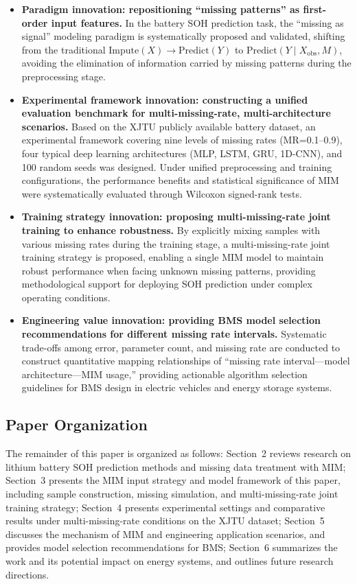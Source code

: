 \documentclass[10pt,a4paper]{article}
\begin{document}
\begin{itemize}
  \item \textbf{Paradigm innovation: repositioning ``missing patterns'' as first-order input features.} In the battery SOH prediction task, the ``missing as signal'' modeling paradigm is systematically proposed and validated, shifting from the traditional $\text{Impute}(X)\rightarrow\text{Predict}(Y)$ to $\text{Predict}(Y \mid X_{\mathrm{obs}}, M)$, avoiding the elimination of information carried by missing patterns during the preprocessing stage.

  \item \textbf{Experimental framework innovation: constructing a unified evaluation benchmark for multi-missing-rate, multi-architecture scenarios.} Based on the XJTU publicly available battery dataset, an experimental framework covering nine levels of missing rates (MR=0.1--0.9), four typical deep learning architectures (MLP, LSTM, GRU, 1D-CNN), and 100 random seeds was designed. Under unified preprocessing and training configurations, the performance benefits and statistical significance of MIM were systematically evaluated through Wilcoxon signed-rank tests.

  \item \textbf{Training strategy innovation: proposing multi-missing-rate joint training to enhance robustness.} By explicitly mixing samples with various missing rates during the training stage, a multi-missing-rate joint training strategy is proposed, enabling a single MIM model to maintain robust performance when facing unknown missing patterns, providing methodological support for deploying SOH prediction under complex operating conditions.

  \item \textbf{Engineering value innovation: providing BMS model selection recommendations for different missing rate intervals.} Systematic trade-offs among error, parameter count, and missing rate are conducted to construct quantitative mapping relationships of ``missing rate interval---model architecture---MIM usage,'' providing actionable algorithm selection guidelines for BMS design in electric vehicles and energy storage systems.
\end{itemize}

\subsection{Paper Organization}

The remainder of this paper is organized as follows: Section~2 reviews research on lithium battery SOH prediction methods and missing data treatment with MIM; Section~3 presents the MIM input strategy and model framework of this paper, including sample construction, missing simulation, and multi-missing-rate joint training strategy; Section~4 presents experimental settings and comparative results under multi-missing-rate conditions on the XJTU dataset; Section~5 discusses the mechanism of MIM and engineering application scenarios, and provides model selection recommendations for BMS; Section~6 summarizes the work and its potential impact on energy systems, and outlines future research directions.
\end{document}
